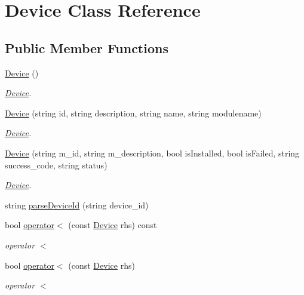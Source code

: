 \hypertarget{classDevice}{}\section{Device Class Reference}
\label{classDevice}
\subsection*{Public Member Functions}
\begin{DoxyCompactItemize}
\item 
\hyperlink{classDevice_a64ba12dcc5f4267486c5d545d04dcf68}{Device} ()
\begin{DoxyCompactList}\small\item\em \hyperlink{classDevice}{Device}. \end{DoxyCompactList}\item 
\hyperlink{classDevice_a107e7a95a02edc5ff586dfc831f1eb76}{Device} (string id, string description, string name, string modulename)
\begin{DoxyCompactList}\small\item\em \hyperlink{classDevice}{Device}. \end{DoxyCompactList}\item 
\hyperlink{classDevice_a11aa3e7c780559e7749bea3ac702e55e}{Device} (string m\+\_\+id, string m\+\_\+description, bool is\+Installed, bool is\+Failed, string success\+\_\+code, string status)
\begin{DoxyCompactList}\small\item\em \hyperlink{classDevice}{Device}. \end{DoxyCompactList}\item 
string \hyperlink{classDevice_a0c77b871987e94ec9088e8ab78f27293}{parse\+Device\+Id} (string device\+\_\+id)
\item 
bool \hyperlink{classDevice_acd077de5b2954ce456927e021c5de5df}{operator$<$} (const \hyperlink{classDevice}{Device} rhs) const
\begin{DoxyCompactList}\small\item\em operator $<$ \end{DoxyCompactList}\item 
bool \hyperlink{classDevice_a660d5da7a710da202ac6c58766370283}{operator$<$} (const \hyperlink{classDevice}{Device} rhs)
\begin{DoxyCompactList}\small\item\em operator $<$ \end{DoxyCompactList}\item 

\end{DoxyCompactItemize}
